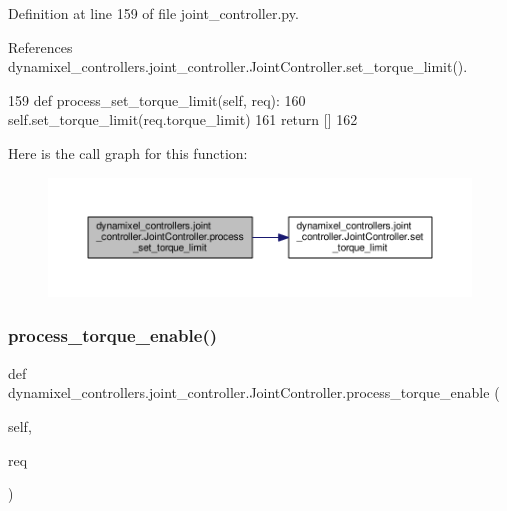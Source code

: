 Definition at line 159 of file joint\+\_\+controller.\+py.



References dynamixel\+\_\+controllers.\+joint\+\_\+controller.\+Joint\+Controller.\+set\+\_\+torque\+\_\+limit().


\begin{DoxyCode}
159     \textcolor{keyword}{def }process\_set\_torque\_limit(self, req):
160         self.set\_torque\_limit(req.torque\_limit)
161         \textcolor{keywordflow}{return} []
162 
\end{DoxyCode}
Here is the call graph for this function\+:
\nopagebreak
\begin{figure}[H]
\begin{center}
\leavevmode
\includegraphics[width=350pt]{d3/dcd/classdynamixel__controllers_1_1joint__controller_1_1_joint_controller_aa199ce6ae353ed44fe71ae96a5da242d_cgraph}
\end{center}
\end{figure}
\mbox{\label{classdynamixel__controllers_1_1joint__controller_1_1_joint_controller_a2181fcf467234ed09e378a93ea5a0553}} 
\subsubsection{\texorpdfstring{process\+\_\+torque\+\_\+enable()}{process\_torque\_enable()}}
{\footnotesize\ttfamily def dynamixel\+\_\+controllers.\+joint\+\_\+controller.\+Joint\+Controller.\+process\+\_\+torque\+\_\+enable (\begin{DoxyParamCaption}\item[{}]{self,  }\item[{}]{req }\end{DoxyParamCaption})}



